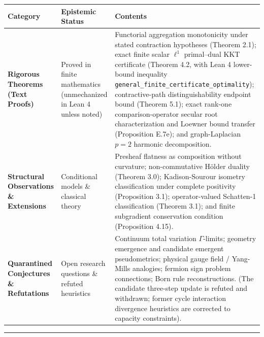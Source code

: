 \documentclass[
]{article}
\begin{document}
\begin{longtable}[]{@{}
  >{\raggedright\arraybackslash}p{}
  >{\raggedright\arraybackslash}p{}
  >{\raggedright\arraybackslash}p{}@{}}
\toprule\noalign{}
\begin{minipage}[b]{\linewidth}\raggedright
Category
\end{minipage} & \begin{minipage}[b]{\linewidth}\raggedright
Epistemic Status
\end{minipage} & \begin{minipage}[b]{\linewidth}\raggedright
Contents
\end{minipage} \\
\midrule\noalign{}
\endhead
\bottomrule\noalign{}
\endlastfoot
\textbf{Rigorous Theorems (Text Proofs)} & Proved in finite mathematics (unmechanized in Lean 4 unless noted) & Functorial aggregation monotonicity under stated contraction hypotheses (Theorem 2.1); exact finite scalar \(\ell^1\) primal--dual KKT certificate (Theorem 4.2, with Lean 4 lower-bound inequality \texttt{general\_finite\_certificate\_optimality}); contractive-path distinguishability endpoint bound (Theorem 5.1); exact rank-one comparison-operator secular root characterization and Loewner bound transfer (Proposition E.7e); and graph-Laplacian \(p=2\) harmonic decomposition. \\
\textbf{Structural Observations \& Extensions} & Conditional models \& classical theory & Presheaf flatness as composition without curvature; non-commutative Hölder duality (Theorem 3.0); Kadison-Sourour isometry classification under complete positivity (Proposition 3.1); operator-valued Schatten-1 classification (Theorem 3.1); and finite subgradient conservation condition (Proposition 4.15). \\
\textbf{Quarantined Conjectures \& Refutations} & Open research questions \& refuted heuristics & Continuum total variation \(\Gamma\)-limits; geometry emergence and candidate emergent pseudometrics; physical gauge field / Yang-Mills analogies; fermion sign problem connections; Born rule reconstructions. (The candidate three-step update is refuted and withdrawn; former cycle interaction divergence heuristics are corrected to capacity constraints). \\
\end{longtable}

\begin{center}\rule{0.5\linewidth}{0.5pt}\end{center}
\end{document}

